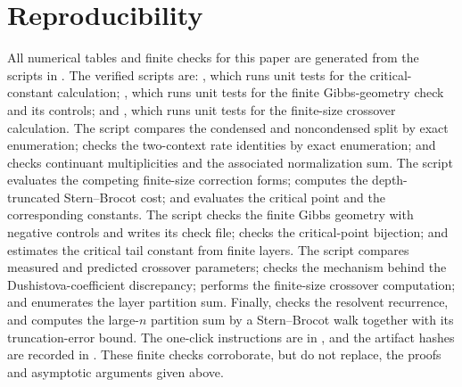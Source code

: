 \section*{Reproducibility}
All numerical tables and finite checks for this paper are generated from the
scripts in .  The verified scripts are: ,
which runs unit tests for the critical-constant calculation; ,
which runs unit tests for the finite Gibbs-geometry check and its controls;
and , which runs unit tests
for the finite-size crossover calculation.  The script
 compares the condensed and
noncondensed split by exact enumeration; 
checks the two-context rate identities by exact enumeration; and
 checks continuant
multiplicities and the associated normalization sum.  The script
 evaluates the competing finite-size
correction forms; 
computes the depth-truncated Stern--Brocot cost; and
 evaluates the critical point and
the corresponding constants.  The script
 checks the finite Gibbs
geometry with negative controls and writes its check file;
 checks the critical-point
bijection; and  estimates the
critical tail constant from finite layers.  The script
 compares measured and
predicted crossover parameters; 
checks the mechanism behind the Dushistova-coefficient discrepancy;
 performs the finite-size
crossover computation; and 
enumerates the layer partition sum.  Finally,
 checks the resolvent recurrence,
and  computes the large-$n$ partition sum
by a Stern--Brocot walk together with its truncation-error bound.
The one-click instructions are in , and the
artifact hashes are recorded in .  These finite
checks corroborate, but do not replace, the proofs and asymptotic arguments
given above.
